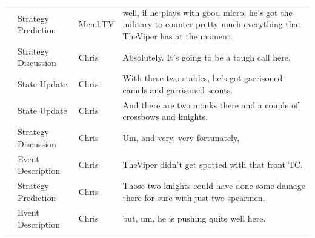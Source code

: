 {\begin{longtable}{@{}>{\theAppRow}r|L{2.3cm}L{1.0cm}U{11.55cm}@{}}
    & Strategy Prediction   & MembTV       & well, if he plays with good micro, he's got the military to counter pretty much everything that TheViper has at the moment.                                                                                                                                      \\
    & Strategy Discussion   & Chris        & Absolutely. It's going to be a tough call here.                                                                                                                                                                                                                  \\
    & State Update          & Chris        & With these two stables, he's got garrisoned camels and garrisoned scouts.                                                                                                                                                                                        \\
    & State Update          & Chris        & And there are two monks there and a couple of crossbows and knights.                                                                                                                                                                                             \\
    & Strategy Discussion   & Chris        & Um, and very, very fortunately,                                                                                                                                                                                                                                  \\
    & Event Description     & Chris        & TheViper didn't get spotted with that front TC.                                                                                                                                                                                                                  \\
    & Strategy Prediction   & Chris        & Those two knights could have done some damage there for sure with just two spearmen,                                                                                                                                                                             \\
    & Event Description     & Chris        & but, um, he is pushing quite well here.                                                                                                                                                                                                                          \\

\end{longtable}}
